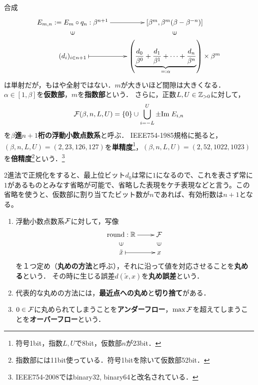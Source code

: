 \documentclass[uplatex, dvipdfmx]{jsreport}
\begin{document}
\begin{definition}
    合成
    \[\xymatrix@R-2pc{
        E_{m,n}:=E_m\circ q_n:\beta^{n+1}\ar[r]&[\beta^m,\beta^m(\beta-\beta^{-n})]\\
        \rotatebox[origin=c]{90}{$\in$}&\rotatebox[origin=c]{90}{$\in$}\\
        (d_i)_{i\in n+1}\ar@{|->}[r]&\paren{\underbrace{\frac{d_0}{\beta^0}+\frac{d_1}{\beta^1}+\cdots+\frac{d_n}{\beta^n}}_{=:\alpha}}\times\beta^m
    }\]
    は単射だが，もはや全射ではない．$m$が大きいほど間隙は大きくなる．$\alpha\in[1,\beta]$を\textbf{仮数部}，$m$を\textbf{指数部}という．
    さらに，正数$L,U\in\mathbb{Z}_{>0}$に対して，
    \[\mathcal{F}(\beta,n,L,U)=\{0\}\cup\bigcup_{i=-L}^{U}\pm\mathrm{Im}\; E_{i,n}\]
    を\textbf{$\beta$進$n+1$桁の浮動小数点数系}と呼ぶ．
    IEEE754-1985規格に拠ると，$(\beta,n,L,U)=(2,23,126,127)$を\textbf{単精度}\footnote{符号1bit，指数$L,U$で8bit，仮数部$n$が23bit．}，$(\beta,n,L,U)=(2,52,1022,1023)$を\textbf{倍精度}\footnote{指数部には11bit使っている．符号1bitを除いて仮数部52bit．}という．\footnote{IEEE754-2008ではbinary32, binary64と改名されている．}
\end{definition}
\begin{remark}[ケチ表現]
    2進法で正規化をすると、最上位ビット$d_0$は常に$1$になるので、これを表さず常に$1$があるものとみなす省略が可能で、省略した表現をケチ表現などと言う。この省略を使うと、仮数部に割り当てたビット数が$n$であれば、有効桁数は$n+1$となる。 
\end{remark}

\begin{definition}\mbox{}
    \begin{enumerate}
        \item 浮動小数点数系$\mathcal{F}$に対して，写像
        \[\xymatrix@R-2pc{
            \round:\R\ar[r]&\F\\
            \rotatebox[origin=c]{90}{$\in$}&\rotatebox[origin=c]{90}{$\in$}\\
            \tilde{x}\ar@{|->}[r]&x
        }\]
        を１つ定め（\textbf{丸めの方法}と呼ぶ），それに沿って値を対応させることを\textbf{丸める}という．
        その時に生じる誤差$d(\tilde{x},x)$を\textbf{丸め誤差}という．
        \item 代表的な丸めの方法には，\textbf{最近点への丸め}と\textbf{切り捨て}がある．
        \item $0\in\mathcal{F}$に丸められてしまうことを\textbf{アンダーフロー}，$\max\mathcal{F}$を超えてしまうことを\textbf{オーバーフロー}という．
    \end{enumerate}
\end{definition}
\end{document}
